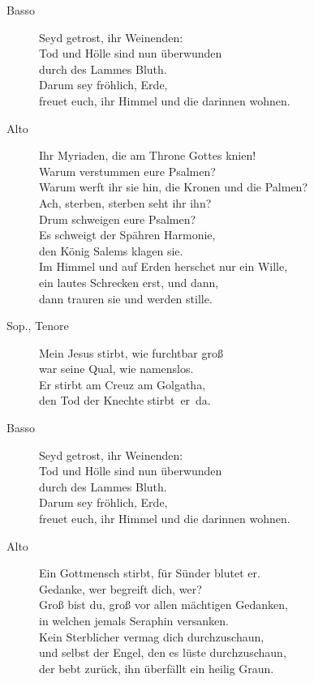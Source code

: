 \documentclass[parskip=full]{scrreprt}
\begin{document}
\begin{description}
	\item[Basso]
	Seyd getrost, ihr Weinenden:\\
	Tod und Hölle sind nun überwunden\\
	durch des Lammes Bluth.\\
	Darum sey fröhlich, Erde,\\
	freuet euch, ihr Himmel und die darinnen wohnen.
	
	\item[Alto]
	Ihr Myriaden, die am Throne Gottes knien!\\
	Warum verstummen eure Psalmen?\\
	Warum werft ihr sie hin, die Kronen und die Palmen?\\
	Ach, sterben, sterben seht ihr ihn?\\
	Drum schweigen eure Psalmen?\\
	Es schweigt der Spähren Harmonie,\\
	den König Salems klagen sie.\\
	Im Himmel und auf Erden herschet nur ein Wille,\\
	ein lautes Schrecken erst, und dann,\\
	dann trauren sie und werden stille.
	
	\item[Sop., Tenore]
	Mein Jesus stirbt, wie furchtbar groß\\
	war seine Qual, wie namenslos.\\
	Er stirbt am Creuz am Golgatha,\\
	den Tod der Knechte stirbt er da.
	
	\item[Basso]
	Seyd getrost, ihr Weinenden:\\
	Tod und Hölle sind nun überwunden\\
	durch des Lammes Bluth.\\
	Darum sey fröhlich, Erde,\\
	freuet euch, ihr Himmel und die darinnen wohnen.
	
	\item[Alto]
	Ein Gottmensch stirbt, für Sünder blutet er.\\
	Gedanke, wer begreift dich, wer?\\
	Groß bist du, groß vor allen mächtigen Gedanken,\\
	in welchen jemals Seraphin versanken.\\
	Kein Sterblicher vermag dich durchzuschaun,\\
	und selbst der Engel, den es lüste durchzuschaun,\\
	der bebt zurück, ihn überfällt ein heilig Graun.
	

\end{description}
\end{document}
